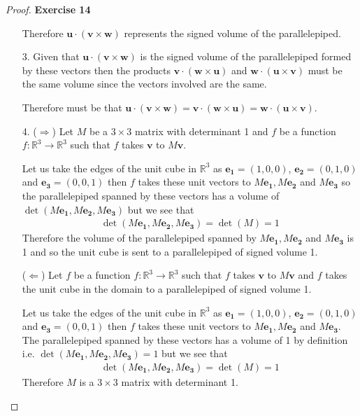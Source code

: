 \documentclass[11pt]{article}
\newcommand{\R}{\mathbb{R}}
\theoremstyle{definition}
\begin{document}
\begin{proof}{\textbf{Exercise 14}}
\begin{itemize}
    Therefore $\bm{u}\cdot(\bm{v}\times\bm{w})$ represents the signed volume of
    the parallelepiped.

    \item [3.] Given that $\bm{u}\cdot(\bm{v} \times \bm{w})$ is the signed
    volume of the parallelepiped formed by these vectors then the products
    $\bm{v}\cdot(\bm{w} \times \bm{u})$ and $\bm{w}\cdot(\bm{u} \times \bm{v})$
    must be the same volume since the vectors involved are the same.

    Therefore must be that
    $\bm{u}\cdot(\bm{v} \times \bm{w}) = \bm{v}\cdot(\bm{w} \times \bm{u})
    = \bm{w}\cdot(\bm{u} \times \bm{v})$.
\cleardoublepage
    \item [4.]
    ($\Rightarrow$) Let $M$ be a $3 \times 3$ matrix with determinant 1
    and $f$ be a function $f:\R^3 \to \R^3$ such that $f$ takes $\bm{v}$ to
    $M\bm{v}$.
    
    Let us take the edges of the unit cube in $\R^3$ as $\bm{e_1} = (1, 0, 0)$,
    $\bm{e_2} = (0, 1, 0)$ and $\bm{e_3} = (0, 0, 1)$ then $f$ takes these unit
    vectors to $M\bm{e_1}, M\bm{e_2}$ and $M\bm{e_3}$ so the parallelepiped
    spanned by these vectors has a volume of
    $\det(M\bm{e_1}, M\bm{e_2}, M\bm{e_3})$ but we see that
    \begin{align*}
        \det(M\bm{e_1}, M\bm{e_2}, M\bm{e_3})
        = \det(M) = 1 
    \end{align*}
    Therefore the volume of the parallelepiped spanned by $M\bm{e_1}, M\bm{e_2}$
    and $M\bm{e_3}$ is 1 and so the unit cube is sent to a parallelepiped of
    signed volume 1.

    ($\Leftarrow$) Let $f$ be a function $f:\R^3 \to \R^3$ such that $f$ takes
    $\bm{v}$ to $M\bm{v}$ and $f$ takes the unit cube in the domain to 
    a parallelepiped of signed volume 1.

    Let us take the edges of the unit cube in $\R^3$ as $\bm{e_1} = (1, 0, 0)$,
    $\bm{e_2} = (0, 1, 0)$ and $\bm{e_3} = (0, 0, 1)$ then $f$ takes these unit
    vectors to $M\bm{e_1}, M\bm{e_2}$ and $M\bm{e_3}$. The parallelepiped
    spanned by these vectors has a volume of 1 by definition i.e.
    $\det(M\bm{e_1}, M\bm{e_2}, M\bm{e_3}) = 1$ but we see that
    \begin{align*}
        \det(M\bm{e_1}, M\bm{e_2}, M\bm{e_3})
        = \det(M) = 1 
    \end{align*}
    Therefore $M$ is a $3 \times 3$ matrix with determinant 1.
\end{itemize}
\end{proof}
\end{document}
